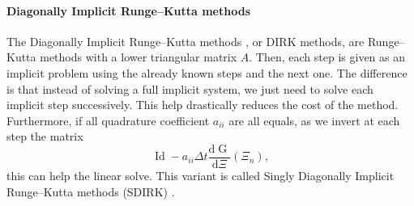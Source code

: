         \paragraph{Diagonally Implicit Runge--Kutta methods}
        The Diagonally Implicit Runge--Kutta methods \cite{Alexander1977}, or DIRK methods, are Runge--Kutta methods with a lower triangular matrix $A$.
        Then, each step is given as an implicit problem using the already known steps and the next one.
        The difference is that instead of solving a full implicit system, we just need to solve each implicit step successively.
        This help drastically reduces the cost of the method.
        Furthermore, if all quadrature coefficient $a_{ii}$ are all equals, as we invert at each step the matrix
        \begin{equation}
          \operatorname{Id} - a_{ii} \Delta t \frac{\mathrm{d} \operatorname{G}}{\mathrm{d} \Xi}\left(\Xi_n\right) ,
        \end{equation}
        this can help the linear solve.
        This variant is called Singly Diagonally Implicit Runge--Kutta methods (SDIRK) \cite{HairerWanner1996}.

